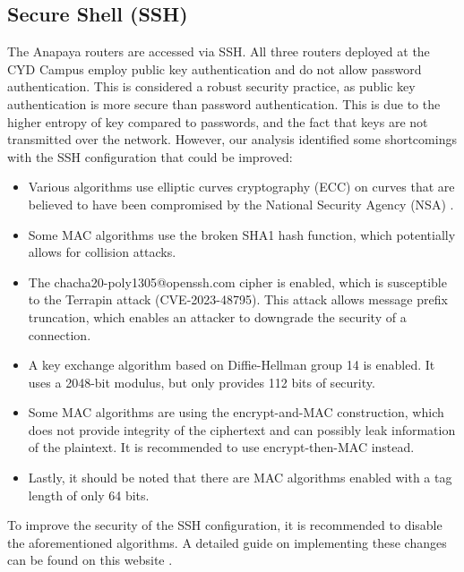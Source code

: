 \subsection{Secure Shell (SSH)}
The Anapaya routers are accessed via SSH.
All three routers deployed at the CYD Campus employ public key authentication and do not allow password authentication.
This is considered a robust security practice, as public key authentication is more secure than password authentication.
This is due to the higher entropy of key compared to passwords, and the fact that keys are not transmitted over the network.
However, our analysis identified some shortcomings with the SSH configuration that could be improved:

\begin{itemize}
    \item Various algorithms use elliptic curves cryptography (ECC) on curves that are believed to have been compromised by the National Security Agency (NSA) \cite{nist1_safecurves}.
    \item Some MAC algorithms use the broken SHA1 hash function, which potentially allows for collision attacks.
    \item The chacha20-poly1305@openssh.com cipher is enabled, which is susceptible to the Terrapin attack (CVE-2023-48795).
    This attack allows message prefix truncation, which enables an attacker to downgrade the security of a connection.
    \item A key exchange algorithm based on Diffie-Hellman group 14 is enabled. It uses a 2048-bit modulus, but only provides 112 bits of security.
    \item Some MAC algorithms are using the encrypt-and-MAC construction, which does not provide integrity of the ciphertext and can possibly leak information of the plaintext.
    It is recommended to use encrypt-then-MAC instead.
    \item Lastly, it should be noted that there are MAC algorithms enabled with a tag length of only 64 bits.
\end{itemize}

To improve the security of the SSH configuration, it is recommended to disable the aforementioned algorithms.
A detailed guide on implementing these changes can be found on this website \cite{sshauditHardeningGuides}.


